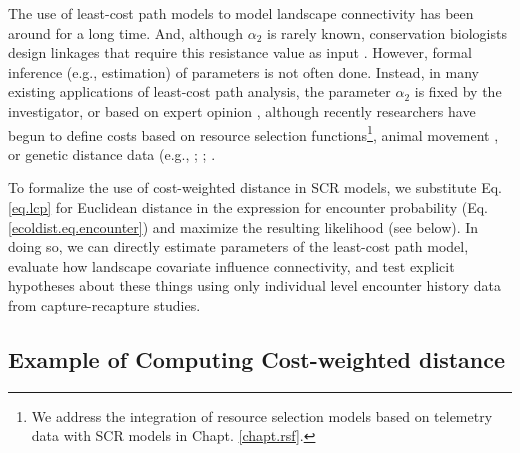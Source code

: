 The use of least-cost path models to model landscape connectivity has
been around for a long time. And, although $\alpha_{2}$ is rarely
known, conservation biologists design linkages that require this
resistance value as input \citep[see][and articles cited
therein]{beier_etal:2008}.  However, formal inference (e.g.,
estimation) of parameters is not often done.  Instead, in many
existing applications of least-cost path analysis, the parameter
$\alpha_{2}$ is fixed by the investigator, or based on expert opinion
\citep{beier_etal:2008}, although recently researchers have begun to
define costs based on resource selection functions\footnote{We address the integration of resource
selection models based on telemetry data with SCR models in
Chapt. \ref{chapt.rsf}.},
animal movement
\citep{tracy:2006, fortin_etal:2005}, or genetic distance data (e.g.,
\citet{gerlach_musolf:2000}; \citet{epps_etal:2007};
\citet{schwartz_etal:2009}.


To formalize the use of cost-weighted distance in SCR models, we
substitute Eq. \ref{eq.lcp} for Euclidean distance
in the expression for encounter
probability (Eq. \ref{ecoldist.eq.encounter}) and maximize the resulting
likelihood (see  below). In doing so, we can directly
estimate parameters of the least-cost path model, evaluate how
landscape covariate influence connectivity, and test explicit hypotheses
about these things using only individual level encounter history data
from capture-recapture studies.


\subsection{Example of Computing Cost-weighted distance}

